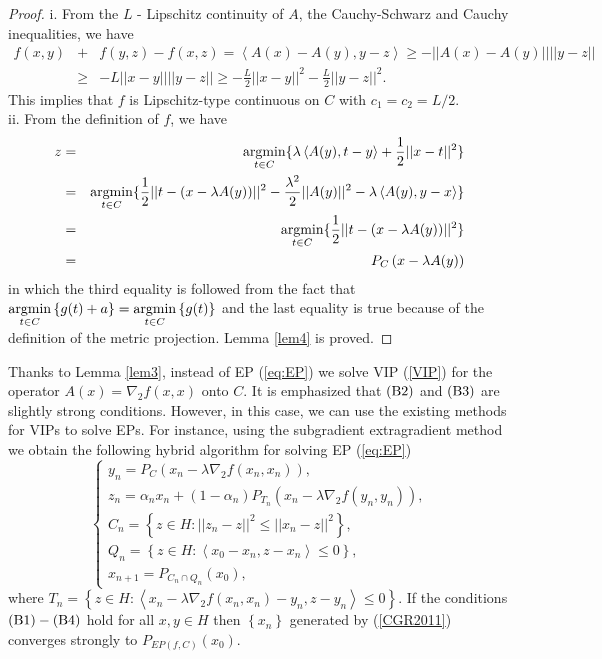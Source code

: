 \documentclass{aims}
\theoremstyle{definition}
\begin{document}
\begin{proof}
i. From the $L$ - Lipschitz continuity of $A$, the Cauchy-Schwarz and Cauchy inequalities, we have
\begin{eqnarray*}
f(x,y)&+&f(y,z)-f(x,z)=\left\langle A(x)-A(y),y-z\right\rangle\ge-||A(x)-A(y)||||y-z||\\
&\ge&-L||x-y||||y-z||\ge-\frac{L}{2}||x-y||^2-\frac{L}{2}||y-z||^2.
\end{eqnarray*}
This implies that $f$ is Lipschitz-type continuous on $C$ with $c_1=c_2=L/2$.\\
ii. From the definition of $f$, we have
 \begin{eqnarray*}
z&=&\underset{t\in C}{\rm argmin} \{ \lambda \left\langle A(y),t-y\right\rangle+\frac{1}{2}||x-t||^2\}\\ 
&=&\underset{t\in C}{\rm argmin} \{\frac{1}{2}||t-(x-\lambda A(y))||^2-\frac{\lambda^2}{2}||A(y)||^2-\lambda \left\langle A(y),y-x\right\rangle\}\\
&=&\underset{t\in C}{\rm argmin} \{\frac{1}{2}||t-(x-\lambda A(y))||^2\}\\
&=&P_C\left(x-\lambda A(y)\right)
\end{eqnarray*}
in which the third equality is followed from the fact that $\underset{t\in C}{\rm argmin}\left\{g(t)+a\right\}=\underset{t\in C}{\rm argmin}\left\{g(t)\right\}$ 
and the last equality is true because of the definition of the metric projection. Lemma \ref{lem4} is proved.
\end{proof}
Thanks to Lemma \ref{lem3}, instead of EP (\ref{eq:EP}) we solve VIP (\ref{VIP}) for the operator $A(x)=\nabla_2 f(x,x)$ onto $C$. 
It is emphasized that $\rm (B2)$ and $\rm (B3)$ are slightly strong conditions. However, in this case, we can use the existing methods for VIPs to solve 
EPs. For instance, using the subgradient extragradient method \cite[Algorithm 3.6]{CGR2011} we obtain the following hybrid algorithm for solving 
EP (\ref{eq:EP})
\begin{equation}\label{CGR2011}
\begin{cases}
y_n=P_{C}(x_n-\lambda \nabla_2 f(x_n,x_n)),\\
z_n=\alpha_n x_n+(1-\alpha_n)P_{T_n}(x_n-\lambda \nabla_2 f(y_n,y_n)),\\
C_n=\left\{z\in H:||z_{n}-z||^2\leq ||x_n-z||^2\right\},\\
Q_n=\left\{z\in H: \left\langle x_0-x_n,z-x_n\right\rangle\le 0\right\},\\
x_{n+1}=P_{C_n\cap Q_n}(x_0),
\end{cases}
\end{equation}
where $T_n=\left\{z\in H:\left\langle x_n-\lambda \nabla_2 f(x_n,x_n)-y_n,z-y_n\right\rangle\le 0\right\}$. If the conditions $\rm (B1)-(B4)$ 
hold for all $x,y \in H$ then $\left\{x_n\right\}$ generated by (\ref{CGR2011}) converges 
strongly to $P_{EP(f,C)}(x_0)$.
\end{document}
